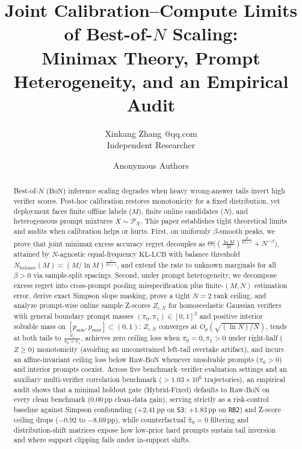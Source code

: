 \documentclass[10pt]{article}
\title{Joint Calibration--Compute Limits of Best-of-$N$ Scaling:\\
Minimax Theory, Prompt Heterogeneity, and an Empirical Audit}
\author{\name Xinkang Zhang \email 3203235490@qq.com \\
      \addr Independent Researcher}
\author{\name Anonymous Authors}
\theoremstyle{plain}
\theoremstyle{definition}
\theoremstyle{remark}
\begin{document}
\maketitle

\begin{abstract}
Best-of-$N$ ($\mathrm{BoN}$) inference scaling degrades when heavy wrong-answer tails invert high verifier scores. Post-hoc calibration restores monotonicity for a fixed distribution, yet deployment faces finite offline labels ($M$), finite online candidates ($N$), and heterogeneous prompt mixtures $X \sim \mathcal{P}_X$. This paper establishes tight theoretical limits and audits when calibration helps or hurts. First, on uniformly $\beta$-smooth peaks, we prove that joint minimax excess accuracy regret decouples as $\Theta\big((\frac{\ln M}{M})^{\frac{\beta}{2\beta+1}} + N^{-\beta}\big)$, attained by $N$-agnostic equal-frequency $\mathrm{KL\text{-}LCB}$ with balance threshold $N_{\mathrm{balance}}(M) \asymp (M/\ln M)^{\frac{1}{2\beta+1}}$, and extend the rate to unknown marginals for all $\beta > 0$ via sample-split spacings. Second, under prompt heterogeneity, we decompose excess regret into cross-prompt pooling misspecification plus finite-$(M,N)$ estimation error, derive exact Simpson slope masking, prove a tight $N=2$ rank ceiling, and analyze prompt-wise online sample Z-scores $Z_{i,N}$ for homoscedastic Gaussian verifiers with general boundary prompt masses $(\pi_0, \pi_1) \in [0,1]^2$ and positive interior solvable mass on $[p_{\min}, p_{\max}] \subset (0, 1)$: $Z_{i,N}$ converges at $O_p(\sqrt{(\ln N)/N})$, tends at both tails to $\frac{\pi_1}{\pi_0+\pi_1}$, achieves zero ceiling loss when $\pi_0 = 0, \pi_1 > 0$ under right-half ($Z \ge 0$) monotonicity (avoiding an unconstrained left-tail overtake artifact), and incurs an affine-invariant ceiling loss below $\mathrm{Raw\text{-}BoN}$ whenever unsolvable prompts ($\pi_0 > 0$) and interior prompts coexist. Across five benchmark--verifier evaluation settings and an auxiliary multi-verifier correlation benchmark ($>1.03\times 10^6$ trajectories), an empirical audit shows that a minimal holdout gate ($\mathrm{Hybrid\text{-}Fixed}$) defaults to $\mathrm{Raw\text{-}BoN}$ on every clean benchmark ($0.00\,\mathrm{pp}$ clean-data gain), serving strictly as a risk-control baseline against Simpson confounding ($+2.41\,\mathrm{pp}$ on \texttt{S3}; $+1.83\,\mathrm{pp}$ on \texttt{RB2}) and Z-score ceiling drops ($-0.92$ to $-8.69\,\mathrm{pp}$), while counterfactual $\hat{\pi}_0 = 0$ filtering and distribution-shift matrices expose how low-prior hard prompts sustain tail inversion and where support clipping fails under in-support shifts.
\end{abstract}
\end{document}

